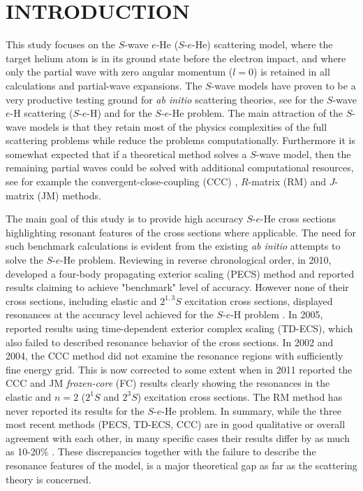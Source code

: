 \documentclass[aip
, pra
, showpacs
, aps
, twocolumn
, groupedaddress
, floatfix
]{revtex4}
\begin{document}
\section{INTRODUCTION}


This study focuses on the $S$-wave $e$-He ($S$-$e$-He) scattering model,
where the target helium atom is in its ground state before the electron impact,
and where only the partial wave with zero angular momentum ($l=0$) is retained in all calculations
and partial-wave expansions.
The $S$-wave models have proven to be a very productive testing ground for {\it ab initio} scattering theories,
see \cite{T62,HY74p1209,P78,P80,P81,CO84,BS92p53,BST93,KM94pL407,IDHF95,PS96,JS02,JS00l,BRIM99,S99l,MHR02,BS04,Frapiccini10} for the $S$-wave $e$-H scattering ($S$-$e$-H)
and \cite{DHIF94,PMR99,PBFS02,PNBFS04,HMR05R,HMR05,BS10p022715,BS10p022716,KFB11} for  the $S$-$e$-He problem.
The main attraction of the $S$-wave models is that they retain most of the physics complexities of the full
scattering problems while reduce the problems computationally.
Furthermore it is somewhat expected that if a theoretical method solves a $S$-wave model, then
the remaining partial waves could be solved with additional computational resources,
see for example the convergent-close-coupling (CCC) \cite{FB95},
$R$-matrix (RM) \cite{FLRS94b, PhysRevA.54.R998, SMC2006}
and $J$-matrix (JM) \cite{KM94pL741,KM95pL139} methods.


The main goal of this study is to provide high accuracy $S$-$e$-He cross sections highlighting resonant features of the cross sections where applicable.
The need for such benchmark calculations is evident from the existing {\em ab initio} attempts to solve the $S$-$e$-He problem.
Reviewing in reverse chronological order, in 2010, \citet{BS10p022715} developed a four-body propagating exterior scaling (PECS) method and reported results claiming to achieve "benchmark" level of accuracy.
However none of their cross sections, including elastic and $2^{1,3}S$ excitation cross sections, displayed resonances at the accuracy level achieved for the $S$-$e$-H problem \cite{P78}.
In 2005, \citet{HMR05} reported results using
time-dependent exterior complex scaling (TD-ECS), which also failed to described resonance behavior of the cross sections.
In 2002 and 2004, the CCC method \cite{PBFS02,PNBFS04} did not examine the resonance regions with sufficiently fine energy grid.
This is now corrected to some extent when in 2011 \citet{KFB11} reported the CCC and JM {\em frozen-core}
(FC) results clearly showing the resonances in the elastic and $n=2$ ($2^1S$ and $2^3S$) excitation cross sections.
The RM method \cite{FLRS94b, SMC2006} has never reported its results for the $S$-$e$-He problem.
In summary, while the three most recent methods (PECS, TD-ECS, CCC) are in good qualitative or overall agreement with each other,
in many specific cases their results differ by as much as 10-20\% \cite{BS10p022715,HMR05}.
These discrepancies together with the failure to describe the resonance features of the model,
is a major theoretical gap as far as the scattering theory is concerned.
\end{document}
